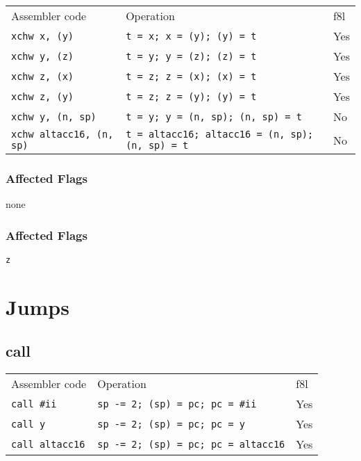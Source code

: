 \documentclass{book}
\begin{document}
\begin{tabular}{l l l}
Assembler code                  & Operation                                              & f8l \\
\texttt{xchw x, (y)}            & \texttt{t = x; x = (y); (y) = t}                       & Yes \\
\texttt{xchw y, (z)}            & \texttt{t = y; y = (z); (z) = t}                       & Yes \\
\texttt{xchw z, (x)}            & \texttt{t = z; z = (x); (x) = t}                       & Yes \\
\texttt{xchw z, (y)}            & \texttt{t = z; z = (y); (y) = t}                       & Yes \\
\texttt{xchw y, (n, sp)}        & \texttt{t = y; y = (n, sp); (n, sp) = t}               & No \\
\texttt{xchw altacc16, (n, sp)} & \texttt{t = altacc16; altacc16 = (n, sp); (n, sp) = t} & No \\
\end{tabular}

\subsubsection*{Affected Flags}

none


\subsubsection*{Affected Flags}

\texttt{z}


\section{Jumps}

\subsection{call}

\begin{tabular}{l l l}
Assembler code         & Operation                                  & f8l \\
\texttt{call \#ii}     & \texttt{sp -= 2; (sp) = pc; pc = \#ii}     & Yes \\
\texttt{call y}        & \texttt{sp -= 2; (sp) = pc; pc = y}        & Yes \\
\texttt{call altacc16} & \texttt{sp -= 2; (sp) = pc; pc = altacc16} & Yes \\
\end{tabular}
\end{document}
